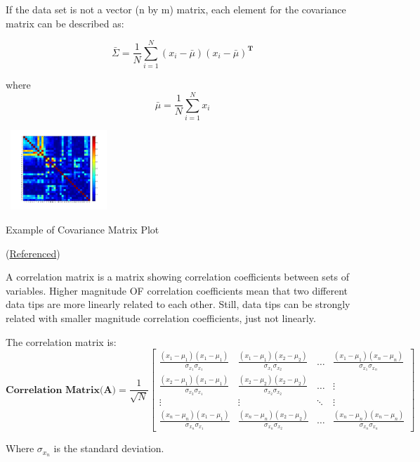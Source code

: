 \documentclass{tufte-handout}
\begin{document}
If the data set is not a vector (n by m) matrix, each element for the covariance matrix can be described as:

\[ \bar{\Sigma} = \frac{1}{N}\sum_{i=1}^{N}(x_{i}-\bar{\mu})(x_{i}-\bar{\mu})^{\textbf{T}} \]

where \[ \bar{\mu} = \frac{1}{N}\sum_{i=1}^{N}x_{i} \]

\begin{marginfigure}
    \centering
    \includegraphics[width = 4cm, height = 3cm]{cov.png}
    \label{fig:cov}
\caption{Example of Covariance Matrix Plot}
(\href{https://www.mathworks.com/matlabcentral/answers/196574-factor-analysis-a-covariance-matrix-is-not-positive-definite}{Referenced})

\end{marginfigure}


A correlation matrix is a matrix showing correlation coefficients between sets of variables. Higher magnitude OF correlation coefficients mean that two different data tips are more linearly related to each other. Still, data tips can be strongly related with smaller magnitude correlation coefficients, just not linearly. 

The correlation matrix is:
\[
\textbf{Correlation Matrix(A)}= 
\frac{1}{\sqrt{N}}
\begin{bmatrix}
    \frac{(x_{1}-\mu_{1})(x_{1}-\mu_{1})}{\sigma_{x_1}\sigma_{x_1}}  & \frac{(x_{1}-\mu_{1})(x_{2}-\mu_{2})}{\sigma_{x_1}\sigma_{x_2}} & \dots & \frac{(x_{1}-\mu_{1})(x_{n}-\mu_{n})}{\sigma_{x_1}\sigma_{x_n}} \\
    \frac{(x_{2}-\mu_{1})(x_{1}-\mu_{1})}{\sigma_{x_2}\sigma_{x_1}}  & \frac{(x_{2}-\mu_{2})(x_{2}-\mu_{2})}{\sigma_{x_2}\sigma_{x_2}} & \dots & \vdots \\
    \vdots & \vdots & \ddots & \vdots \\
    \frac{(x_{n}-\mu_{n})(x_{1}-\mu_{1})}{\sigma_{x_n}\sigma_{x_1}}  & \frac{(x_{n}-\mu_{n})(x_{2}-\mu_{2})}{\sigma_{x_n}\sigma_{x_2}} & \dots & \frac{(x_{n}-\mu_{n})(x_{n}-\mu_{n})}{\sigma_{x_n}\sigma_{x_n}} 
\end{bmatrix}
\]


Where $\sigma_{x_n}$ is the standard deviation.
\end{document}
